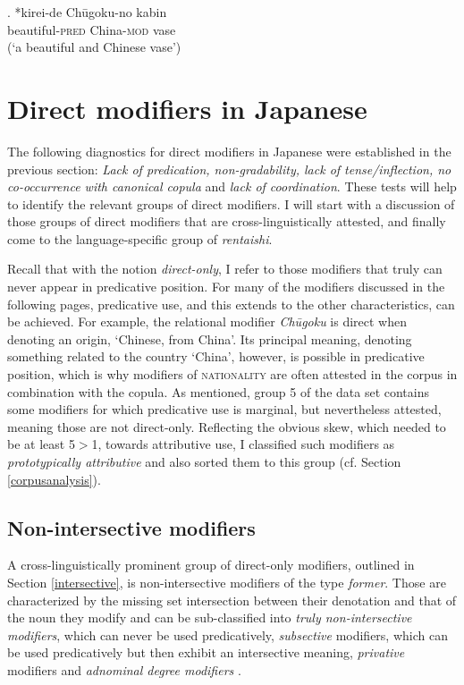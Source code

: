 \exg. *kirei-de Chūgoku-no kabin\\
beautiful-\textsc{pred} China-\textsc{mod} vase\\
(`a beautiful and Chinese vase’) \label{kirei second conjunct}

\section{Direct modifiers in Japanese} \label{section direct modifiers}

The following diagnostics for direct modifiers in Japanese were established in the previous section: \textit{Lack of predication, non-gradability, lack of tense/inflection, no co-occurrence with canonical copula} and \textit{lack of coordination}. These tests will help to identify the relevant groups of direct modifiers. I will start with a discussion of those groups of direct modifiers that are cross-linguistically attested, and finally come to the language-specific group of \textit{rentaishi}.

Recall that with the notion \textit{direct-only}, I refer to those modifiers that truly can never appear in predicative position. For many of the modifiers discussed in the following pages, predicative use, and this extends to the other characteristics, can be achieved. For example, the relational modifier \textit{Chūgoku} is direct when denoting an origin, `Chinese, from China’. Its principal meaning, denoting something related to the country `China’, however, is possible in predicative position, which is why modifiers of \textsc{nationality} are often attested in the corpus in combination with the copula. As mentioned, group 5 of the data set contains some modifiers for which predicative use is marginal, but nevertheless attested, meaning those are not direct-only. Reflecting the obvious skew, which needed to be at least 5$>$1, towards attributive use, I classified such modifiers as \textit{prototypically attributive} and also sorted them to this group (cf. Section \ref{corpusanalysis}).

\subsection{Non-intersective modifiers} \label{non-intersective Japanese}

A cross-linguistically prominent group of direct-only modifiers, outlined in Section \ref{intersective}, is non-intersective modifiers of the type \textit{former}. Those are characterized by the missing set intersection between their denotation and that of the noun they modify and can be sub-classified into \textit{truly non-intersective modifiers}, which can never be used predicatively, \textit{subsective} modifiers, which can be used predicatively but then exhibit an intersective meaning, \textit{privative} modifiers and \textit{adnominal degree modifiers} \citep{vendler:1957:verbs, bolinger:1967:adj, larson:1998:events, morzycki:2016:mod}.

